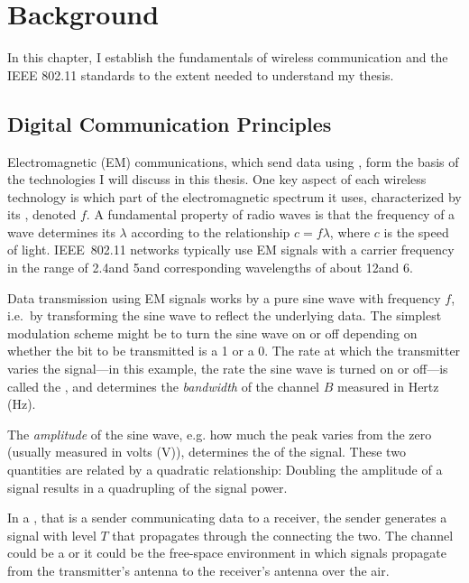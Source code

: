 \ifx\mainfile\undefined

\setcounter{chapter}{1} %
\fi

\cleardoublepage
\chapter{Background}
\label{chap:background}

In this chapter, I establish the fundamentals of wireless communication and the IEEE 802.11 standards to the extent needed to understand my thesis.

\section{Digital Communication Principles}
Electromagnetic (EM) communications, which send data using , form the basis of the technologies I will discuss in this thesis. One key aspect of each wireless technology is which part of the electromagnetic spectrum it uses, characterized by its , denoted $f$. A fundamental property of radio waves is that the frequency of a wave determines its  $\lambda$ according to the relationship $c=f\lambda$, where $c$ is the speed of light. IEEE~802.11 networks typically use EM signals with a carrier frequency in the range of 2.4\GHz and 5\GHz and corresponding wavelengths of about 12\cm and 6\cm.

Data transmission using EM signals works by  a pure sine wave with frequency $f$, i.e.\ by transforming the sine wave to reflect the underlying data. The simplest modulation scheme might be to turn the sine wave on or off depending on whether the bit to be transmitted is a 1 or a 0. The rate at which the transmitter varies the signal---in this example, the rate the sine wave is turned on or off---is called the , and determines the \emph{bandwidth} of the channel $B$ measured in Hertz (Hz).

The \emph{amplitude} of the sine wave, e.g. how much the peak varies from the zero (usually measured in volts (V)), determines the  of the signal. These two quantities are related by a quadratic relationship: Doubling the amplitude of a signal results in a quadrupling of the signal power.

In a , that is a sender communicating data to a receiver, the sender generates a signal with  level $T$ that propagates through the  connecting the two. The channel could be a  or it could be the free-space  environment in which signals propagate from the transmitter's antenna to the receiver's antenna over the air.

